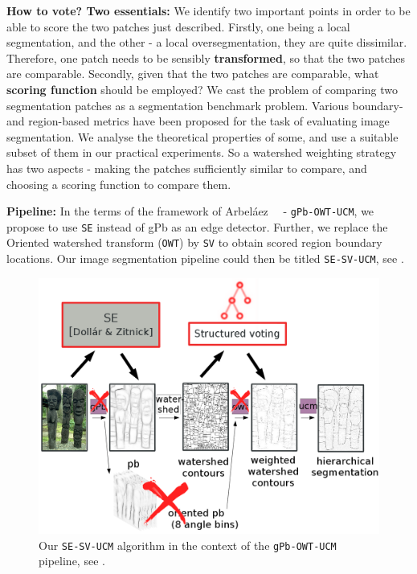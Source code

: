 \textbf{How to vote? Two essentials:} We identify two important points in order to be able to score the two patches just described. 
Firstly, one being a local segmentation, and the other - a local oversegmentation, they are quite dissimilar. Therefore, one patch needs to be sensibly \textbf{transformed}, so that the two patches are comparable. 
Secondly, given that the two patches are comparable, what \textbf{scoring function} should be employed? We cast the problem of comparing two segmentation patches as a segmentation benchmark problem. Various boundary- and region-based metrics have been proposed for the task of evaluating image segmentation. We analyse the theoretical properties of some, and use a suitable %
subset of them in our practical experiments. 
So a watershed weighting strategy has two aspects - making the patches sufficiently similar to compare, and choosing a scoring function to compare them.

\textbf{Pipeline:} In the terms of the framework of Arbel\'aez~\etal~\cite{Arbelaez11} - {\tt gPb-OWT-UCM}, we propose to use {\tt SE} instead of gPb as an edge detector. Further, we replace the Oriented watershed transform ({\tt OWT}) by {\tt SV} to obtain scored region boundary locations. Our image segmentation pipeline could then be titled {\tt SE-SV-UCM}, see .

\begin{figure}[t]
\centering
 \includegraphics[width=1\textwidth]{images/SE-SV-UCM/SE-SV-UCM_pipeline.png}
\caption[Our {\tt SE-SV-UCM} algorithm in the context of the {\tt gPb-OWT-UCM} pipeline]{Our {\tt SE-SV-UCM} algorithm in the context of the {\tt gPb-OWT-UCM} pipeline, see .}
\label{fig:SE-SV-UCM-pipeline}
\end{figure}

